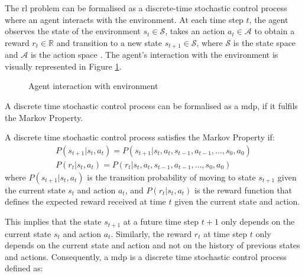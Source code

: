 The \acrshort{rl} problem can be formalised as a discrete-time stochastic control process where an agent interacts with the environment. At each time step $t$, the agent observes the state of the environment $s_t \in \mathcal{S}$, takes an action $a_t \in \mathcal{A}$ to obtain a reward $r_t \in \mathbb{R}$ and transition to a new state $s_{t+1} \in \mathcal{S}$, where $\mathcal{S}$ is the state space and $\mathcal{A}$ is the action space \cite{Francois-Lavet2018}. The agent's interaction with the environment is visually represented in Figure \ref{fig:agent_environment_interaction}.

\begin{figure}[ht]
    \label{fig:agent_environment_interaction}
    \centering
    
    \caption{Agent interaction with environment}
\end{figure}

A discrete time stochastic control process can be formalised as a \acrfull{mdp}, if it fulfils the Markov Property. 

\begin{definition}
    A discrete time stochastic control process satisfies the Markov Property if:
    \begin{eqnarray}
        P(s_{t+1} | s_t, a_t) = P(s_{t+1} | s_t, a_t, s_{t-1}, a_{t-1}, \dots, s_0, a_0) \\  
        P(r_t | s_t, a_t) = P(r_t | s_t, a_t, s_{t-1}, a_{t-1}, \dots, s_0, a_0)
    \end{eqnarray}
    where $P(s_{t+1} | s_t, a_t)$ is the transition probability of moving to state $s_{t+1}$ given the current state $s_t$ and action $a_t$, and $P(r_t | s_t, a_t)$ is the reward function that defines the expected reward received at time $t$ given the current state and action.
\end{definition}

This implies that the state $s_{t+1}$ at a future time step $t+1$ only depends on the current state $s_t$ and action $a_t$. Similarly, the reward $r_t$ at time step $t$ only depends on the current state and action and not on the history of previous states and actions. Consequently, a \acrlong{mdp} \cite{Bellman1957} is a discrete time stochastic control process defined as:

